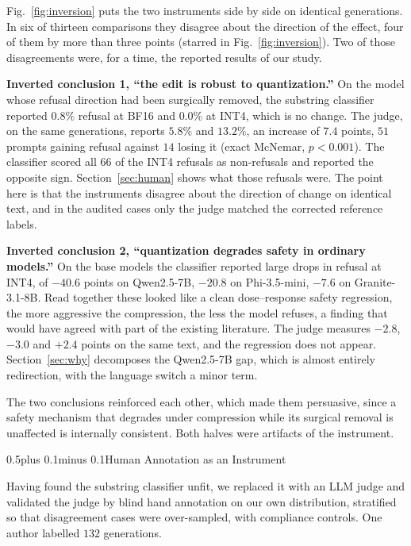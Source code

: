 \documentclass[conference,compsoc,letterpaper]{IEEEtran}
\makeatletter
\def\section{\@startsection{section}{1}{\z@}{1\baselineskip plus 0.25\baselineskip minus 0.25\baselineskip}%
{0.5\baselineskip plus 0.1\baselineskip minus 0.1\baselineskip}{\normalfont\large\bfseries}}%
\makeatother
\begin{document}
Fig.~\ref{fig:inversion} puts the two instruments side by side on identical generations. In six of thirteen comparisons they disagree about the direction of the effect, four of them by more than three points (starred in Fig.~\ref{fig:inversion}). Two of those disagreements were, for a time, the reported results of our study.

\textbf{Inverted conclusion 1, ``the edit is robust to quantization.''} On the model whose refusal direction had been surgically removed, the substring classifier reported $0.8\%$ refusal at BF16 and $0.0\%$ at INT4, which is no change. The judge, on the same generations, reports $5.8\%$ and $13.2\%$, an increase of $7.4$ points, $51$ prompts gaining refusal against $14$ losing it (exact McNemar, $p<0.001$). The classifier scored all $66$ of the INT4 refusals as non-refusals and reported the opposite sign. Section~\ref{sec:human} shows what those refusals were. The point here is that the instruments disagree about the direction of change on identical text, and in the audited cases only the judge matched the corrected reference labels.

\textbf{Inverted conclusion 2, ``quantization degrades safety in ordinary models.''} On the base models the classifier reported large drops in refusal at INT4, of $-40.6$ points on Qwen2.5-7B, $-20.8$ on Phi-3.5-mini, $-7.6$ on Granite-3.1-8B. Read together these looked like a clean dose--response safety regression, the more aggressive the compression, the less the model refuses, a finding that would have agreed with part of the existing literature. The judge measures $-2.8$, $-3.0$ and $+2.4$ points on the same text, and the regression does not appear. Section~\ref{sec:why} decomposes the Qwen2.5-7B gap, which is almost entirely redirection, with the language switch a minor term.

The two conclusions reinforced each other, which made them persuasive, since a safety mechanism that degrades under compression while its surgical removal is unaffected is internally consistent. Both halves were artifacts of the instrument.

\section{Human Annotation as an Instrument}
\label{sec:human}

Having found the substring classifier unfit, we replaced it with an LLM judge
and validated the judge by blind hand annotation on our own distribution,
stratified so that disagreement cases were over-sampled, with compliance
controls. One author labelled $132$ generations.
\end{document}
